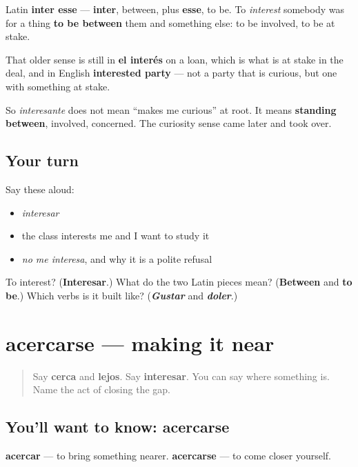 \begin{cousinweb}
Latin \textbf{inter esse} — \textbf{inter}, between, plus \textbf{esse}, to be. To \emph{interest} somebody was for a thing \textbf{to be between} them and something else: to be involved, to be at stake.

That older sense is still in \textbf{el interés} on a loan, which is what is at stake in the deal, and in English \textbf{interested party} — not a party that is curious, but one with something at stake.

So \emph{interesante} does not mean \textquotedblleft{}makes me curious\textquotedblright{} at root. It means \textbf{standing between}, involved, concerned. The curiosity sense came later and took over.
\end{cousinweb}

\subsection*{Your turn}
Say these aloud:

\begin{itemize}
\raggedright
  \item \emph{interesar}
  \item the class interests me and I want to study it
  \item \emph{no me interesa}, and why it is a polite refusal
\end{itemize}

\begin{tcolorbox}[breakable,colback=teal!4,colframe=teal!35!black,title={Before you move on}]
To interest? (\textbf{Interesar}.) What do the two Latin pieces mean? (\textbf{Between} and \textbf{to be}.) Which verbs is it built like? (\emph{\textbf{Gustar}} and \emph{\textbf{doler}}.)
\end{tcolorbox}
\section[acercarse]{acercarse — making it near}

\label{lesson:ES-C443-acercarse}



\begin{quote}
Say \textbf{cerca} and \textbf{lejos}. Say \textbf{interesar}. You can say where something is. Name the act of closing the gap.
\end{quote}

\subsection*{You'll want to know: acercarse}
\textbf{acercar} — to bring something nearer. \textbf{acercarse} — to come closer yourself.

